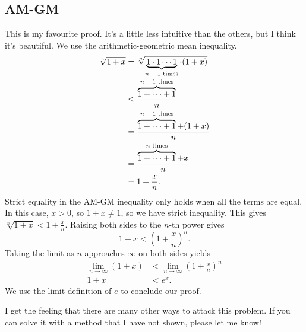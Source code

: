 \documentclass[10pt,letterpaper,]{article}
\begin{document}
\hypertarget{am-gm}{%
\subsection{AM-GM}\label{am-gm}}

This is my favourite proof. It's a little less intuitive than the
others, but I think it's beautiful. We use the arithmetic-geometric mean
inequality. \begin{equation}
    \begin{split}
        \sqrt[n]{1+x} &= \sqrt[n]{\smash[b]{\underbrace{1\cdot1\cdots1}_{\text{$n-1$ times}}\cdot(1+x)}} \\[1em]
        &\le \frac{\overbrace{1+\dotsb+1}^{\text{$n-1$ times}}}{n} \\
        &= \frac{\overbrace{1+\dotsb+1}^{\text{$n-1$ times}}+(1+x)}{n} \\
        &= \frac{\overbrace{1+\dotsb+1}^{\text{$n$ times}}+x}{n} \\
        &= 1 + \frac{x}{n}.
    \end{split}
\end{equation} Strict equality in the AM-GM inequality only holds when
all the terms are equal. In this case, \(x > 0\), so \(1 + x \neq 1\),
so we have strict inequality. This gives
\(\sqrt[n]{1+x} < 1 + \frac{x}{n}\). Raising both sides to the \(n\)-th
power gives \begin{equation}
    1 + x < \left(1 + \frac{x}{n}\right)^n.
\end{equation} Taking the limit as \(n\) approaches \(\infty\) on both
sides yields \begin{equation}
    \begin{split}
        \lim_{n\to\infty} (1 + x) &< \lim_{n\to\infty} \left(1 + \frac{x}{n}\right)^n \\
        1 + x &< e^x.
    \end{split}
\end{equation} We use the limit definition of \(e\) to conclude our
proof.

I get the feeling that there are many other ways to attack this problem.
If you can solve it with a method that I have not shown, please let me
know!
\end{document}
